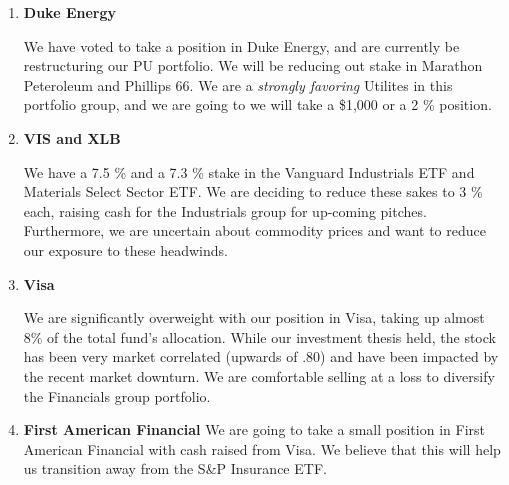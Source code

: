 \documentclass[11pt,pressrelease]{newlfm} %
\begin{document}
\begin{newlfm}


\vspace{-.50 in}
\begin{singlespace} %

\begin{enumerate}
\item \textbf{Duke Energy} \par
We have voted to take a position in Duke Energy, and are currently be restructuring our PU portfolio.  We will be reducing out stake in Marathon Peteroleum and Phillips 66.  We are a \textit{strongly favoring} Utilites in this portfolio group, and we are going to we will take a \$1,000 or a 2 \% position.  

\item  \textbf{VIS and XLB} \par
We have a 7.5 \% and a 7.3 \% stake in the Vanguard Industrials ETF and Materials Select Sector ETF.  We are deciding to reduce these sakes to 3 \% each, raising cash for the Industrials group for up-coming pitches.  Furthermore, we are uncertain about commodity prices and want to reduce our exposure to these headwinds.

\item \textbf{Visa} \par
We are significantly overweight with our position in Visa, taking up almost 8\% of the total fund's allocation.  While our investment thesis held, the stock has been very market correlated (upwards of .80) and have been impacted by the recent market downturn.  We are comfortable selling at a loss to diversify the Financials group portfolio.  

\item \textbf{First American Financial} We are going to take a small position in First American Financial with cash raised from Visa.  We believe that this will help us transition away from the S\&P Insurance ETF.  



\end{enumerate}


\end{singlespace} %




\end{newlfm}
\end{document}
